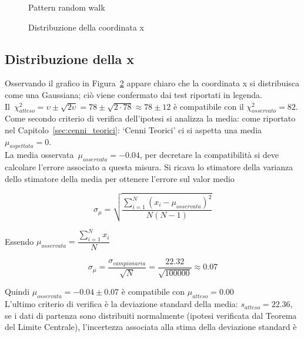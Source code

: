 \documentclass[a4paper,12pt]{article}
\begin{document}
\begin{figure}
    \centering
    \sffamily
    \resizebox{1\textwidth}{!}{%
        
    }
    \caption{Pattern random walk}%
    \label{fig:random_pattern}
\end{figure}

\begin{figure}
    \centering
    \sffamily
    \resizebox{0.85\textwidth}{!}{%
        
    }
    \caption{Distribuzione della coordinata x}%
    \label{fig:distribuzione_della_coordinata_x}
\end{figure}

\subsection{Distribuzione della x}

Osservando il grafico in Figura~\ref{fig:distribuzione_della_coordinata_x} appare chiaro che la coordinata x si distribuisca come una Gaussiana; ciò viene confermato dai test riportati in legenda. \\
Il~$\chi^2_{atteso}=\upsilon \pm \sqrt{2\upsilon} = 78 \pm \sqrt{2\cdot78} \approx 78 \pm 12$ è compatibile con il $\chi^2_{osservato} = 82$. Come secondo criterio di verifica dell'ipotesi si analizza la media: come riportato nel Capitolo~\ref{sec:cenni_teorici}: `Cenni Teorici' ci si aspetta una media~$\mu_{aspettata} = 0$. \\
La media osservata~$\mu_{osservata} = -0.04$, per decretare la compatibilità si deve calcolare l'errore associato a questa misura. Si ricava lo stimatore della varianza dello stimatore della media per ottenere l'errore sul valor medio

\[ \sigma_{\mu} = \sqrt{\dfrac{\sum_{i=1}^{N}{(x_i - \mu_{osservata})}^2}{N(N-1)}} \]  

Essendo $\mu_{osservata} = \dfrac{\sum_{i=1}^{N}x_i}{N}$

\[ \sigma_\mu = \dfrac{\sigma_{campionaria}}{\sqrt{N}} = \dfrac{22.32}{\sqrt{100000}} \approx 0.07 \]

Quindi $\mu_{osservata} = -0.04 \pm 0.07$ è compatibile con $\mu_{atteso} = 0.00$\\
L'ultimo criterio di verifica è la deviazione standard della media: $s_{atteso} = 22.36$, se i dati di partenza sono distribuiti normalmente (ipotesi verificata dal Teorema del Limite Centrale), l'incertezza associata alla stima della deviazione standard è
\end{document}
